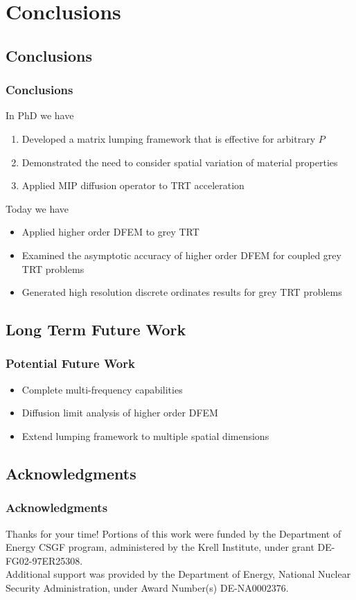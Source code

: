 \documentclass{beamer}
\begin{document}
\section{Conclusions}
\subsection{Conclusions}
\begin{frame}
\frametitle{Conclusions}
In PhD we have
\begin{enumerate}
\item Developed a matrix lumping framework that is effective for arbitrary $P$
\item Demonstrated the need to consider spatial variation of material properties
\item Applied MIP diffusion operator to TRT acceleration
\end{enumerate}
Today we have
\begin{itemize}
\item Applied higher order DFEM to grey TRT
\item Examined the asymptotic accuracy of higher order DFEM for coupled grey TRT problems
\item Generated high resolution discrete ordinates results for grey TRT problems 
\end{itemize}
\end{frame}

\subsection{Long Term Future Work}
\begin{frame}
\frametitle{Potential Future Work}
\begin{itemize}
\item Complete multi-frequency capabilities
\item Diffusion limit analysis of higher order DFEM
\item Extend lumping framework to multiple spatial dimensions
\end{itemize}
\end{frame}

\subsection{Acknowledgments}
\begin{frame}
\frametitle{Acknowledgments}
Thanks for your time!
\vspace{0.3in}
Portions of this work were funded by the Department of Energy CSGF program, administered by the Krell Institute, under grant DE-FG02-97ER25308.
\\
\vspace{0.3in}
Additional support was provided by the Department of Energy, National Nuclear Security Administration, under Award Number(s) DE-NA0002376.

\end{frame}

\end{document}
